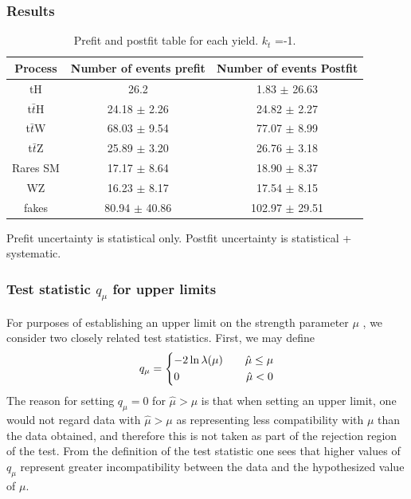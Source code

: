 \documentclass[11pt]{beamer}
\begin{document}
\begin{frame}
\frametitle{Results}

\begin{table}
\caption{Prefit and postfit table for each yield. $k_{t}$ =-1.}
	\begin{tabular}{|c|c|c|}
		\hline
		Process  & Number of events prefit    & Number of events Postfit \\
		\hline
		tH & 26.2 & 1.83 $\pm$ 26.63\\
		\hline
		t$\bar{t}$H  & 24.18 $\pm$ 2.26& 24.82 $\pm$ 2.27\\
		\hline
		t$\bar{t}$W  & 68.03  $\pm$ 9.54 & 77.07 $\pm$ 8.99\\
		\hline
		t$\bar{t}$Z  & 25.89  $\pm$  3.20& 26.76 $\pm$ 3.18\\
		\hline
		Rares SM & 17.17  $\pm$ 8.64 & 18.90 $\pm$ 8.37\\
		\hline
		WZ & 16.23  $\pm$ 8.17& 17.54 $\pm$ 8.15\\
		\hline
		fakes  & 80.94   $\pm$ 40.86& 102.97 $\pm$ 29.51\\
		\hline
	\end{tabular}	
\end{table}
 Prefit uncertainty is statistical only. Postfit uncertainty is statistical + systematic.
\end{frame}





\begin{frame}
\frametitle{ Test statistic $q_{\mu}$ for upper limits}
For purposes of establishing an upper limit on the strength parameter $\mu$ , we consider two
closely related test statistics. First, we may define
\begin{align*} 
q_{\mu}=
\begin{dcases}
-2\ln\lambda(\mu) \qquad \hat{\mu} \leq \mu	\\
0  \qquad \qquad \qquad \hat{\mu}< 0
\end{dcases}
\end{align*}
 The reason for setting $q_\mu = 0$
for $\hat{\mu}>\mu $ is that when setting an upper limit, one would not regard data with $\hat{\mu}>\mu $ as
representing less compatibility with $\mu$ than the data obtained, and therefore this is not taken
as part of the rejection region of the test. From the definition of the test statistic one sees that
higher values of $q_\mu$ represent greater incompatibility between the data and the hypothesized
value of $\mu$.
\end{frame}
\end{document}
